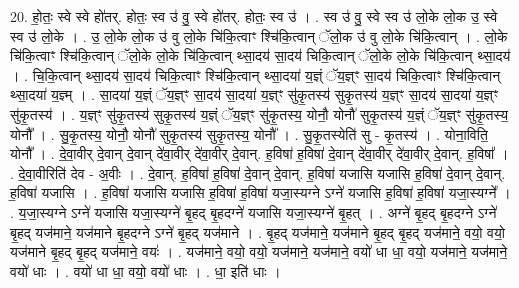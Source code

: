 \documentclass[17pt]{extarticle}
\begin{document}
20. हो॒तः॒ स्वे स्वे हो॑तर्. होतः॒ स्व उ॑ वु॒ स्वे हो॑तर्. होतः॒ स्व उ॑ । . स्व उ॑ वु॒ स्वे स्व उ॑ लो॒के लो॒क उ॒ स्वे स्व उ॑ लो॒के । . उ॒ लो॒के लो॒क उ॑ वु लो॒के चि॑कि॒त्वाꣳ श्चि॑कि॒त्वान् ॅलो॒क उ॑ वु लो॒के चि॑कि॒त्वान् । . लो॒के चि॑कि॒त्वाꣳ श्चि॑कि॒त्वान् ॅलो॒के लो॒के चि॑कि॒त्वान् थ्सा॒दय॑ सा॒दय॑ चिकि॒त्वान् ॅलो॒के लो॒के चि॑कि॒त्वान् थ्सा॒दय॑ । . चि॒कि॒त्वान् थ्सा॒दय॑ सा॒दय॑ चिकि॒त्वाꣳ श्चि॑कि॒त्वान् थ्सा॒दया॑ य॒ज्ञ्ं ॅय॒ज्ञ्ꣳ सा॒दय॑ चिकि॒त्वाꣳ
श्चि॑कि॒त्वान् थ्सा॒दया॑ य॒ज्ञ्म् । . सा॒दया॑ य॒ज्ञ्ं ॅय॒ज्ञ्ꣳ सा॒दय॑ सा॒दया॑ य॒ज्ञ्ꣳ सु॑कृ॒तस्य॑ सुकृ॒तस्य॑ य॒ज्ञ्ꣳ सा॒दय॑ सा॒दया॑ य॒ज्ञ्ꣳ सु॑कृ॒तस्य॑ । . य॒ज्ञ्ꣳ सु॑कृ॒तस्य॑ सुकृ॒तस्य॑ य॒ज्ञ्ं ॅय॒ज्ञ्ꣳ सु॑कृ॒तस्य॒ योनौ॒ योनौ॑ सुकृ॒तस्य॑ य॒ज्ञ्ं ॅय॒ज्ञ्ꣳ सु॑कृ॒तस्य॒ योनौ᳚ । . सु॒कृ॒तस्य॒ योनौ॒ योनौ॑ सुकृ॒तस्य॑ सुकृ॒तस्य॒ योनौ᳚ । . सु॒कृ॒तस्येति॑ सु - कृ॒तस्य॑ । . योना॒विति॒ योनौ᳚ । . दे॒वा॒वीर् दे॒वान् दे॒वान् दे॑वा॒वीर् दे॑वा॒वीर् दे॒वान्. ह॒विषा॑ ह॒विषा॑ दे॒वान् दे॑वा॒वीर् दे॑वा॒वीर् दे॒वान्. ह॒विषा᳚ । . दे॒वा॒वीरिति॑ देव - अ॒वीः । . दे॒वान्. ह॒विषा॑ ह॒विषा॑ दे॒वान् दे॒वान्. ह॒विषा॑ यजासि यजासि ह॒विषा॑ दे॒वान् दे॒वान्. ह॒विषा॑ यजासि । . ह॒विषा॑ यजासि यजासि ह॒विषा॑ ह॒विषा॑ यजा॒स्यग्ने ऽग्ने॑ यजासि ह॒विषा॑ ह॒विषा॑ यजा॒स्यग्ने᳚ । . य॒जा॒स्यग्ने ऽग्ने॑ यजासि यजा॒स्यग्ने॑ बृ॒हद् बृ॒हदग्ने॑ यजासि यजा॒स्यग्ने॑ बृ॒हत् । . अग्ने॑ बृ॒हद् बृ॒हदग्ने ऽग्ने॑ बृ॒हद् यज॑माने॒ यज॑माने बृ॒हदग्ने ऽग्ने॑ बृ॒हद् यज॑माने । . बृ॒हद् यज॑माने॒ यज॑माने बृ॒हद् बृ॒हद् यज॑माने॒ वयो॒ वयो॒ यज॑माने बृ॒हद् बृ॒हद् यज॑माने॒ वयः॑ । . यज॑माने॒ वयो॒ वयो॒ यज॑माने॒ यज॑माने॒ वयो॑ धा धा॒ वयो॒ यज॑माने॒ यज॑माने॒ वयो॑ धाः । . वयो॑ धा धा॒ वयो॒ वयो॑ धाः । . धा॒ इति॑ धाः । \newline
\end{document}
